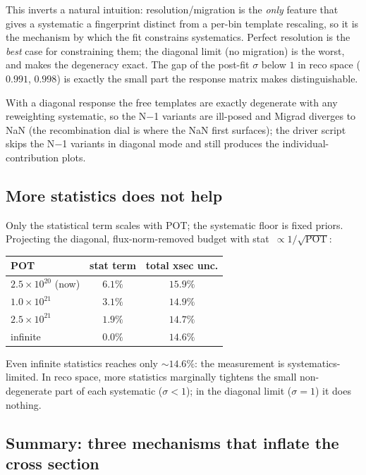 \documentclass[11pt]{article}
\begin{document}
This inverts a natural intuition: resolution/migration is the \emph{only}
feature that gives a systematic a fingerprint distinct from a per-bin template
rescaling, so it is the mechanism by which the fit constrains systematics.
Perfect resolution is the \emph{best} case for constraining them; the diagonal
limit (no migration) is the worst, and makes the degeneracy exact. The gap of
the post-fit $\sigma$ below $1$ in reco space ($0.991$, $0.998$) is exactly the
small part the response matrix makes distinguishable.

With a diagonal response the free templates are exactly degenerate with any
reweighting systematic, so the N$-$1 variants are ill-posed and Migrad diverges
to NaN (the recombination dial is where the NaN first surfaces); the driver
script skips the N$-$1 variants in diagonal mode and still produces the
individual-contribution plots.

\subsection{More statistics does not help}

Only the statistical term scales with POT; the systematic floor is fixed priors.
Projecting the diagonal, flux-norm-removed budget with
stat~$\propto 1/\sqrt{\text{POT}}$:

\begin{center}
\begin{tabular}{@{}lcc@{}}
\toprule
POT & stat term & total xsec unc. \\
\midrule
$2.5\times10^{20}$ (now) & $6.1\%$ & $15.9\%$ \\
$1.0\times10^{21}$       & $3.1\%$ & $14.9\%$ \\
$2.5\times10^{21}$       & $1.9\%$ & $14.7\%$ \\
infinite                 & $0.0\%$ & $14.6\%$ \\
\bottomrule
\end{tabular}
\end{center}

Even infinite statistics reaches only $\sim\!14.6\%$: the measurement is
systematics-limited. In reco space, more statistics marginally tightens the
small non-degenerate part of each systematic ($\sigma<1$); in the diagonal limit
($\sigma=1$) it does nothing.

\subsection{Summary: three mechanisms that inflate the cross section}
\end{document}

